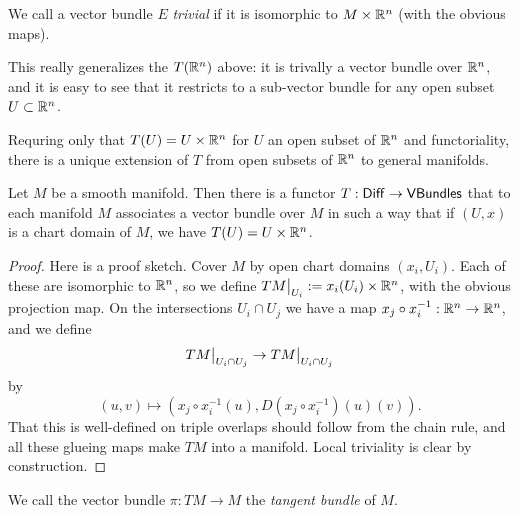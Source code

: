 \documentclass[11pt, english]{article}
\begin{document}
We call a vector bundle $E$ \emph{trivial} if it is isomorphic to $M \times \mathbb{R}^n$ (with the obvious maps).

This really generalizes the $T(\mathbb{R}^n)$ above: it is trivally a vector bundle over $\mathbb{R}^n$, and it is easy to see that it restricts to a sub-vector bundle for any open subset $U \subset \mathbb{R}^n$. 

Requring only that $T(U)=U \times \mathbb{R}^n$ for $U$ an open subset of $\mathbb{R}^n$ and functoriality, there is a unique extension of $T$ from open subsets of $\mathbb{R}^n$ to general manifolds.

\begin{thm}
Let $M$ be a smooth manifold. Then there is a functor $T:\mathsf{Diff} \to \mathsf{VBundles}$ that to each manifold $M$ associates a vector bundle over $M$ in such a way that if $(U,x)$ is a chart domain of $M$, we have $T(U) = U \times \mathbb{R}^n$. 
\end{thm}
\begin{proof}
  Here is a proof sketch. Cover $M$ by open chart domains $(x_i,U_i)$. Each of these are isomorphic to $\mathbb{R}^n$, so we define $\restr{TM}{U_i} := x_i(U_i) \times \R^n$, with the obvious projection map. On the intersections $U_i \cap U_j$ we have a map $x_j \circ x_i^{-1}: \mathbb{R}^n \to \mathbb{R}^n$, and we define
\[
\restr{TM}{U_i \cap U_j} \to \restr{TM}{U_i \cap U_j}
\]
by 
\[
(u,v) \mapsto \left(x_j \circ x_i^{-1}(u), D(x_j \circ x_i^{-1})(u)(v)\right).
\]
That this is well-defined on triple overlaps should follow from the chain rule, and all these glueing maps make $TM$ into a manifold. Local triviality is clear by construction. 
\end{proof}

We call the vector bundle $\pi:TM \to M$ the \emph{tangent bundle} of $M$.
\end{document}
